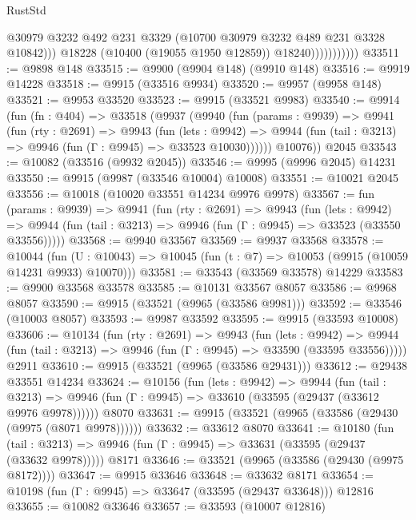 \begin{lexlean}{RustStd}
\begin{coremodule}
                              @30979
                              @3232
                              @492
                              @231
                              @3329
                              (@10700 @30979 @3232 @489 @231 @3328 @10842)))
                          @18228
                          (@10400 (@19055 @1950 @12859))
                          @18240)))))))))))
@33511 := @9898 @148
@33515 := @9900 (@9904 @148) (@9910 @148)
@33516 := @9919 @14228
@33518 := @9915 (@33516 @9934)
@33520 := @9957 (@9958 @148)
@33521 := @9953 @33520
@33523 := @9915 (@33521 @9983)
@33540 := @9914
    (fun (fn : @404) =>
    @33518
      (@9937
        (@9940
          (fun (params : @9939) =>
          @9941
            (fun (rty : @2691) =>
            @9943
              (fun (lets : @9942) =>
              @9944 (fun (tail : @3213) => @9946 (fun (Γ : @9945) => @33523 @10030))))))
        @10076))
    @2045
@33543 := @10082 (@33516 (@9932 @2045))
@33546 := @9995 (@9996 @2045) @14231
@33550 := @9915 (@9987 (@33546 @10004) @10008)
@33551 := @10021 @2045
@33556 := @10018 (@10020 @33551 @14234 @9976 @9978)
@33567 := fun (params : @9939) =>
  @9941
    (fun (rty : @2691) =>
    @9943
      (fun (lets : @9942) =>
      @9944 (fun (tail : @3213) => @9946 (fun (Γ : @9945) => @33523 (@33550 @33556)))))
@33568 := @9940 @33567
@33569 := @9937 @33568
@33578 := @10044
    (fun (U : @10043) => @10045 (fun (t : @7) => @10053 (@9915 (@10059 @14231 @9933) @10070)))
@33581 := @33543 (@33569 @33578) @14229
@33583 := @9900 @33568 @33578
@33585 := @10131 @33567 @8057
@33586 := @9968 @8057
@33590 := @9915 (@33521 (@9965 (@33586 @9981)))
@33592 := @33546 (@10003 @8057)
@33593 := @9987 @33592
@33595 := @9915 (@33593 @10008)
@33606 := @10134
    (fun (rty : @2691) =>
    @9943
      (fun (lets : @9942) =>
      @9944 (fun (tail : @3213) => @9946 (fun (Γ : @9945) => @33590 (@33595 @33556)))))
    @2911
@33610 := @9915 (@33521 (@9965 (@33586 @29431)))
@33612 := @29438 @33551 @14234
@33624 := @10156
    (fun (lets : @9942) =>
    @9944
      (fun (tail : @3213) =>
      @9946 (fun (Γ : @9945) => @33610 (@33595 (@29437 (@33612 @9976 @9978))))))
    @8070
@33631 := @9915 (@33521 (@9965 (@33586 (@29430 (@9975 (@8071 @9978))))))
@33632 := @33612 @8070
@33641 := @10180
    (fun (tail : @3213) => @9946 (fun (Γ : @9945) => @33631 (@33595 (@29437 (@33632 @9978)))))
    @8171
@33646 := @33521 (@9965 (@33586 (@29430 (@9975 @8172))))
@33647 := @9915 @33646
@33648 := @33632 @8171
@33654 := @10198 (fun (Γ : @9945) => @33647 (@33595 (@29437 @33648))) @12816
@33655 := @10082 @33646
@33657 := @33593 (@10007 @12816)

\end{coremodule}
\end{lexlean}
